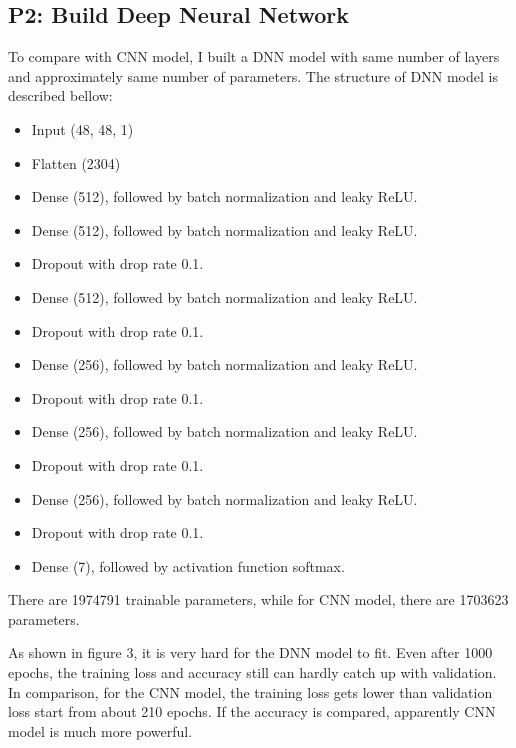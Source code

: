 \documentclass[fleqn,a4paper,12pt]{article}
\begin{document}
\subsection*{P2: Build Deep Neural Network}

To compare with CNN model, I built a DNN model with same number of layers and approximately same number of parameters. The structure of DNN model is described bellow:

\begin{itemize}
\item Input (48, 48, 1)
\item Flatten (2304)
\item Dense (512), followed by batch normalization and leaky ReLU.
\item Dense (512), followed by batch normalization and leaky ReLU.
\item Dropout with drop rate 0.1.
\item Dense (512), followed by batch normalization and leaky ReLU.
\item Dropout with drop rate 0.1.
\item Dense (256), followed by batch normalization and leaky ReLU.
\item Dropout with drop rate 0.1.
\item Dense (256), followed by batch normalization and leaky ReLU.
\item Dropout with drop rate 0.1.
\item Dense (256), followed by batch normalization and leaky ReLU.
\item Dropout with drop rate 0.1.
\item Dense (7), followed by activation function softmax.
\end{itemize}

There are 1974791 trainable parameters, while for CNN model, there are 1703623 parameters.

As shown in figure 3, it is very hard for the DNN model to fit. Even after 1000 epochs, the training loss and accuracy still can hardly catch up with validation. In comparison, for the CNN model, the training loss gets lower than validation loss start from about 210 epochs. If the accuracy is compared, apparently CNN model is much more powerful. 
\end{document}
